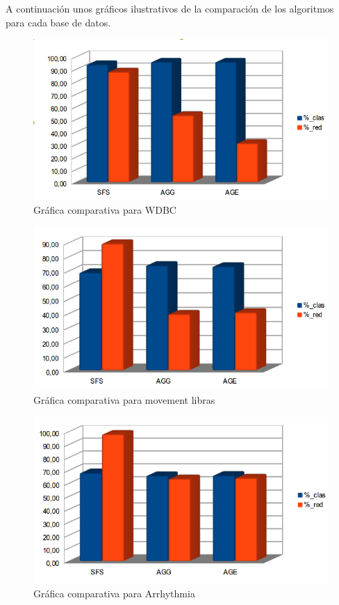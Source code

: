 \\
\\
A continuación unos gráficos ilustrativos de la comparación de los algoritmos para cada base de datos.
\begin{figure} [H]
\centering
\includegraphics[width=1.0\linewidth]{graficaWDBC}
\caption{Gráfica comparativa para WDBC}
\label{fig:graficaWDBC}
\end{figure}

\begin{figure} [H]
\centering
\includegraphics[width=1.0\linewidth]{graficaMovement}
\caption{Gráfica comparativa para movement libras}
\label{fig:graficaMovement}
\end{figure}

\begin{figure} [H]
\centering
\includegraphics[width=1.0\linewidth]{graficaArrhythmia}
\caption{Gráfica comparativa para Arrhythmia}
\label{fig:graficaArrhythmia}
\end{figure}


